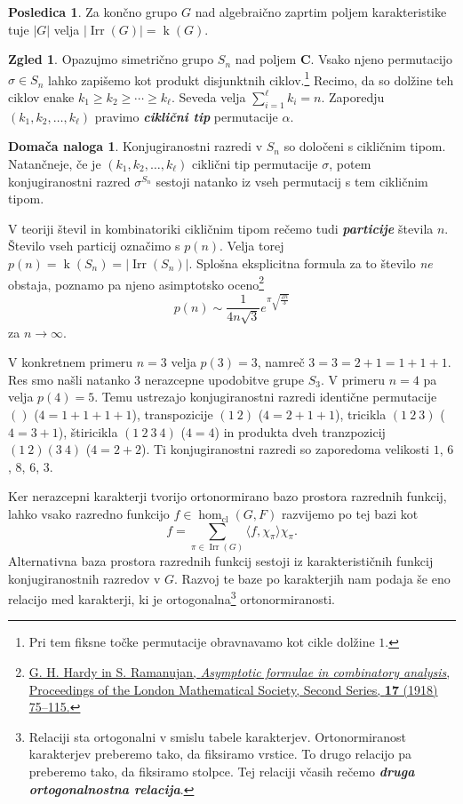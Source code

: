 \documentclass[11pt]{book}
\def\CC{\mathbf{C}}
\DeclareMathOperator\Irr{Irr}
\DeclareMathOperator\kk{k}
\DeclareMathOperator\cl{cl}
\def\definicija{\color{rdeca}\bf\em}
\theoremstyle{definition}
\theoremstyle{zgled}
\newtheorem*{zgled}{Zgled}
\theoremstyle{odprtproblem}
\theoremstyle{domacanaloga}
\newtheorem*{domacanaloga}{Domača naloga}
\theoremstyle{izrek}
\newtheorem*{posledica}{Posledica}
\begin{document}
\begin{posledica}
Za končno grupo $G$ nad algebraično zaprtim poljem karakteristike tuje $|G|$ velja $|\Irr(G)| = \kk(G)$.
\end{posledica}

\begin{zgled}
Opazujmo simetrično grupo $S_n$ nad poljem $\CC$. Vsako njeno permutacijo $\sigma \in S_n$ lahko zapišemo kot produkt disjunktnih ciklov.\footnote{Pri tem fiksne točke permutacije obravnavamo kot cikle dolžine $1$.} Recimo, da so dolžine teh ciklov enake $k_1 \geq k_2 \geq \cdots \geq k_{\ell}$. Seveda velja $\sum_{i = 1}^{\ell} k_i = n$. Zaporedju $(k_1, k_2, \dots, k_{\ell})$ pravimo {\definicija ciklični tip} permutacije $\alpha$. 

\begin{domacanaloga}
Konjugiranostni razredi v $S_n$ so določeni s cikličnim tipom. Natančneje, če je $(k_1, k_2, \dots, k_{\ell})$ ciklični tip permutacije $\sigma$, potem konjugiranostni razred $\sigma^{S_n}$ sestoji natanko iz vseh permutacij s tem cikličnim tipom.
\end{domacanaloga}

V teoriji števil in kombinatoriki cikličnim tipom rečemo tudi {\definicija particije} števila $n$. Število vseh particij označimo s $p(n)$. Velja torej $p(n) = \kk(S_n) = |\Irr(S_n)|$. Splošna eksplicitna formula za to število \emph{ne} obstaja, poznamo pa njeno asimptotsko oceno\footnote{\href{https://academic.oup.com/plms/article-abstract/s2-17/1/75/1536632?redirectedFrom=PDF}{G. H. Hardy in S. Ramanujan, \emph{Asymptotic formulae in combinatory analysis}, Proceedings of the London Mathematical Society, Second Series, \textbf{17} (1918) 75--115.}}
\[
    p(n) \sim \frac{1}{4 n \sqrt{3}} e^{\pi \sqrt{\frac{2n}{3}}}
\]
za $n \to \infty$. 

V konkretnem primeru $n = 3$ velja $p(3) = 3$, namreč $3 = 3 = 2 + 1 = 1 + 1 + 1$. Res smo našli natanko $3$ nerazcepne upodobitve grupe $S_3$. V primeru $n = 4$ pa velja $p(4) = 5$. Temu ustrezajo konjugiranostni razredi identične permutacije $()$ ($4 = 1 + 1 + 1 + 1$), transpozicije $(1 \ 2)$ ($4 = 2 + 1 + 1$), tricikla $(1 \ 2 \ 3)$ ($4 = 3 + 1$), štiricikla $(1 \ 2 \ 3 \ 4)$ ($4 = 4$) in produkta dveh tranzpozicij $(1 \ 2)(3 \ 4)$ ($4 = 2 + 2$). Ti konjugiranostni razredi so zaporedoma velikosti $1$, $6$, $8$, $6$, $3$.
\end{zgled}

Ker nerazcepni karakterji tvorijo ortonormirano bazo prostora razrednih funkcij, lahko vsako razredno funkcijo $f \in \hom_{\cl}(G,F)$ razvijemo po tej bazi kot
\[
    f = \sum_{\pi \in \Irr(G)} \langle f, \chi_{\pi} \rangle \chi_{\pi}.
\]
Alternativna baza prostora razrednih funkcij sestoji iz karakterističnih funkcij konjugiranostnih razredov v $G$. Razvoj te baze po karakterjih nam podaja še eno relacijo med karakterji, ki je ortogonalna\footnote{Relaciji sta ortogonalni v smislu tabele karakterjev. Ortonormiranost karakterjev preberemo tako, da fiksiramo vrstice. To drugo relacijo pa preberemo tako, da fiksiramo stolpce. Tej relaciji včasih rečemo {\definicija druga ortogonalnostna relacija}.} ortonormiranosti.
\end{document}
